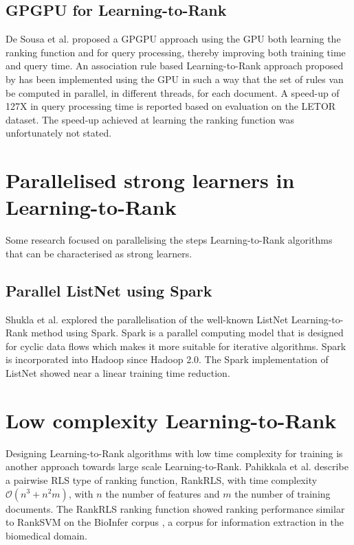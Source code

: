 \subsection{GPGPU for Learning-to-Rank}
De Sousa et al. \cite{DeSousa2012} proposed a \ac{GPGPU} approach using the \ac{GPU} both learning the ranking function and for query processing, thereby improving both training time and query time. An association rule based Learning-to-Rank approach proposed by \cite{Veloso2008} has been implemented using the \ac{GPU} in such a way that the set of rules van be computed in parallel, in different threads, for each document. A speed-up of 127X in query processing time is reported based on evaluation on the LETOR dataset. The speed-up achieved at learning the ranking function was unfortunately not stated.\\

\section{Parallelised strong learners in Learning-to-Rank}
Some research focused on parallelising the steps Learning-to-Rank algorithms that can be characterised as strong learners.
\subsection{Parallel ListNet using Spark}
Shukla et al. \cite{Shukla2012} explored the parallelisation of the well-known ListNet Learning-to-Rank method using Spark. Spark is a parallel computing model that is designed for cyclic data flows which makes it more suitable for iterative algorithms. Spark is incorporated into Hadoop since Hadoop 2.0. The Spark implementation of ListNet showed near a linear training time reduction.\\

\section{Low complexity Learning-to-Rank}
Designing Learning-to-Rank algorithms with low time complexity for training is another approach towards large scale Learning-to-Rank. Pahikkala et al. \cite{Pahikkala2009} describe a pairwise \ac{RLS} type of ranking function, RankRLS, with time complexity $\mathcal{O}(n^3+n^2m)$, with $n$ the number of features and $m$ the number of training documents. The RankRLS ranking function showed ranking performance similar to RankSVM on the BioInfer corpus \cite{Pyysalo2007}, a corpus for information extraction in the biomedical domain.\\

